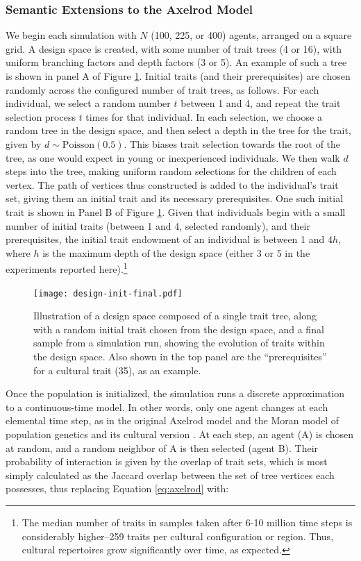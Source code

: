 \documentclass[referee,graybox,natbib]{svmult}
\begin{document}
\subsubsection{Semantic Extensions to the Axelrod
Model}\label{semantic-extensions-to-the-axelrod-model}

We begin each simulation with $N$ (100, 225, or 400) agents, arranged on
a square grid. A design space is created, with some number of trait
trees (4 or 16), with uniform branching factors and depth factors (3 or
5). An example of such a tree is shown in panel A of Figure
\ref{img:prereq}. Initial traits (and their prerequisites) are chosen
randomly across the configured number of trait trees, as follows. For
each individual, we select a random number $t$ between 1 and 4, and
repeat the trait selection process $t$ times for that individual. In
each selection, we choose a random tree in the design space, and then
select a depth in the tree for the trait, given by
$d  \sim \textrm{Poisson}(0.5)$. This biases trait selection towards the
root of the tree, as one would expect in young or inexperienced
individuals. We then walk $d$ steps into the tree, making uniform random
selections for the children of each vertex. The path of vertices thus
constructed is added to the individual's trait set, giving them an
initial trait and its necessary prerequisites. One such initial trait is
shown in Panel B of Figure \ref{img:prereq}. Given that individuals
begin with a small number of initial traits (between 1 and 4, selected
randomly), and their prerequisites, the initial trait endowment of an
individual is between 1 and $4h$, where $h$ is the maximum depth of the
design space (either 3 or 5 in the experiments reported here).\footnote{The
  median number of traits in samples taken after 6-10 million time steps
  is considerably higher--259 traits per cultural configuration or
  region. Thus, cultural repertoires grow significantly over time, as
  expected.}

\begin{figure}[htbp] 
\centering 
\texttt{[image: design-init-final.pdf]} 
\caption{Illustration of a design space composed of a single trait tree, along with a random initial trait chosen from the design space, and a final sample from a simulation run, showing the evolution of traits within the design space.  Also shown in the top panel are the ``prerequisites'' for a cultural trait (35), as an example.} 
\label{img:prereq} 
\end{figure}

Once the population is initialized, the simulation runs a discrete
approximation to a continuous-time model. In other words, only one agent
changes at each elemental time step, as in the original Axelrod model
and the Moran model of population genetics and its cultural version
\citep{aoki2011rates, moran1962statistical, moran1958random}. At each
step, an agent (A) is chosen at random, and a random neighbor of A is
then selected (agent B). Their probability of interaction is given by
the overlap of trait sets, which is most simply calculated as the
Jaccard overlap between the set of tree vertices each possesses, thus
replacing Equation \ref{eq:axelrod} with:
\end{document}
